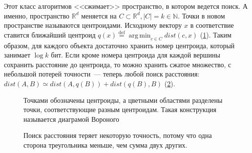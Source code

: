 \documentclass[a4paper,12pt]{extarticle}
\DeclareMathOperator*{\argmin}{arg\,min}
\begin{document}
\label{QUANT}

Этот класс алгоритмов <<сжимает>> пространство, в котором ведется поиск. А именно, пространство $\mathbb{R}^d$ меняется на $C \subset \mathbb{R}^d, |C| = k \in \mathbb{N}$. Точки в новом пространстве называются центроидами. Исходному вектору $x$ в соответствие ставится ближайший центроид $q(x) \stackrel{\text{def}}{=} \displaystyle \argmin_{c \in C} dist(c, x)$ (\cref{ris:voronoi}). Таким образом, для каждого объекта достаточно хранить номер центроида, который занимает $\log k$ бит. Если кроме номера центроида для каждой вершины сохранить расстояние до центроида, то можно хранить сжатое множество, с небольшой потерей точности~--- теперь любой поиск расстояния: $dist(A, B) \simeq dist(A, q(B)) + dist(q(B), B)$ (\cref{ris:loss_quant}).

\begin{center}
\begin{figure}[H]
\caption{Точками обозначены центроиды, а цветными областями разделены точки, соответствующие разным центроидам. Такая конструкция называется диаграмой Вороного}
\label{ris:voronoi}
\end{figure}
\end{center}

\begin{center}
\begin{figure}[H]
\caption{Поиск расстояния теряет некоторую точность, потому что одна сторона треугольника меньше, чем сумма двух других.}
\label{ris:loss_quant}
\end{figure}
\end{center}
\end{document}
